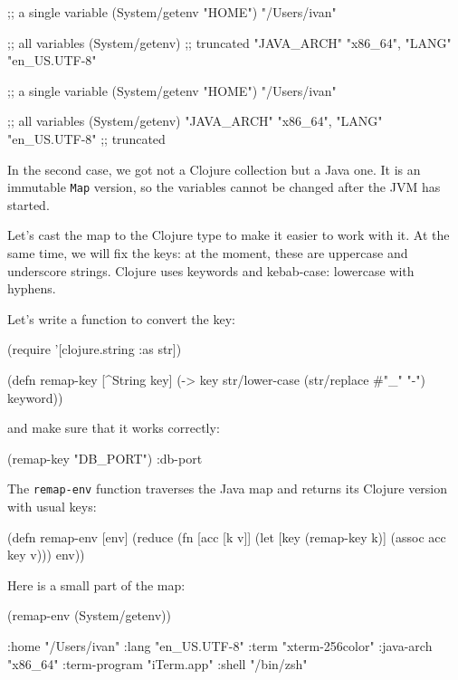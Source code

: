 \ifnarrow

\begin{clojure}
;; a single variable
(System/getenv "HOME")
"/Users/ivan"

;; all variables
(System/getenv)
;; truncated
{"JAVA_ARCH" "x86_64",
 "LANG" "en_US.UTF-8"}
\end{clojure}

\else

\begin{clojure}
;; a single variable
(System/getenv "HOME")
"/Users/ivan"

;; all variables
(System/getenv)
{"JAVA_ARCH" "x86_64", "LANG" "en_US.UTF-8"} ;; truncated
\end{clojure}

\fi

In the second case, we got not a Clojure collection but a Java one. It is an immutable \verb|Map| version, so the variables cannot be changed after the JVM has started.

Let's cast the map to the Clojure type to make it easier to work with it. At the same time, we will fix the keys: at the moment, these are uppercase and underscore strings. Clojure uses keywords and kebab-case: lowercase with hyphens.

Let's write a function to convert the key:

\begin{clojure}
(require '[clojure.string :as str])

(defn remap-key [^String key]
  (-> key
      str/lower-case
      (str/replace #"_" "-")
      keyword))
\end{clojure}

\noindent
and make sure that it works correctly:

\begin{clojure}
(remap-key "DB_PORT")
:db-port
\end{clojure}


The \verb|remap-env| function traverses the Java map and returns its Clojure version with usual keys:

\begin{clojure}
(defn remap-env [env]
  (reduce
   (fn [acc [k v]]
     (let [key (remap-key k)]
       (assoc acc key v)))
   {}
   env))
\end{clojure}

Here is a small part of the map:

\begin{clojure}
(remap-env (System/getenv))

{:home "/Users/ivan"
 :lang "en_US.UTF-8"
 :term "xterm-256color"
 :java-arch "x86_64"
 :term-program "iTerm.app"
 :shell "/bin/zsh"}
\end{clojure}

